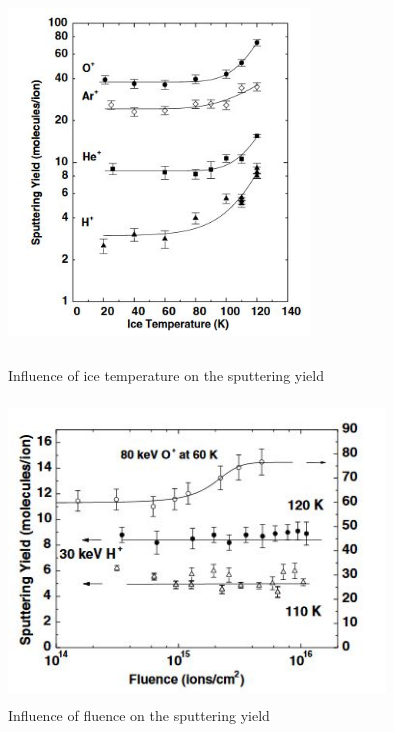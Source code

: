 \begin{figure}[htb]
\centering
\includegraphics[width=8cm, height=10cm, clip]{figures/Paul/sputtering30kev.JPG}
\caption{Influence of ice temperature on the sputtering yield}
\label{sputtering30kev}
\end{figure}
    
\begin{figure}[htb]
\centering
\includegraphics[width=10cm, height=8cm, clip]{figures/Paul/sputteringfluence.JPG}
\caption{Influence of fluence on the sputtering yield}
\label{sputteringfluence}
\end{figure}
    
